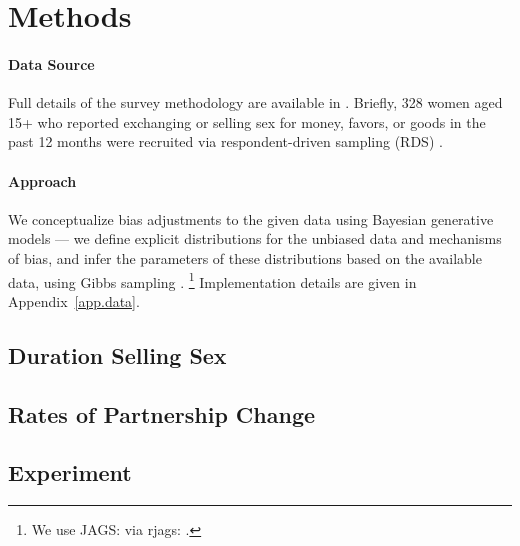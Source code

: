 \section{Methods}\label{meth}
\paragraph{Data Source}
Full details of the survey methodology are available in \cite{Yam2013}.
Briefly, 328 women aged 15+
who reported exchanging or selling sex for money, favors, or goods in the past 12 months
were recruited via respondent-driven sampling (RDS) \cite{Heckathorn1997}.
\paragraph{Approach}
We conceptualize bias adjustments to the given data using Bayesian generative models
--- \ie we define explicit distributions for the unbiased data and mechanisms of bias,
and infer the parameters of these distributions based on the available data,
using Gibbs sampling \cite{Geman1984}.%
\footnote{We use JAGS: 
  via rjags: .}
Implementation details are given in Appendix~\ref{app.data}.

\subsection{Duration Selling Sex}\label{meth.yss}


\subsection{Rates of Partnership Change}\label{meth.partners}

\subsection{Experiment}\label{meth.exp}
